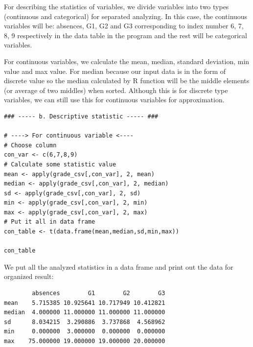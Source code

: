 \documentclass[a4paper]{article}
\newcounter{subsubsubsection}[subsubsection]
\numberwithin{equation}{section}
\begin{document}
For describing the statistics of variables, we divide variables into two types (continuous and categorical) for separated analyzing. In this case, the continuous variables will be: absences, G1, G2 and G3 corresponding to index number 6, 7, 8, 9 respectively in the data table in the program and the rest will be categorical variables.

For continuous variables, we calculate the mean, median, standard deviation, min value and max value. For median because our input data is in the form of discrete value so the median calculated by R function will be the middle elements (or average of two middles) when sorted. Although this is for discrete type variables, we can still use this for continuous variables for approximation.

\begin{mdframed}[leftline=false,rightline=false,backgroundcolor=magenta!10,nobreak=true]
  \begin{verbatim}
### ----- b. Descriptive statistic ----- ###

# ----> For continuous variable <----
# Choose column
con_var <- c(6,7,8,9)
# Calculate some statistic value
mean <- apply(grade_csv[,con_var], 2, mean)
median <- apply(grade_csv[,con_var], 2, median)
sd <- apply(grade_csv[,con_var], 2, sd)
min <- apply(grade_csv[,con_var], 2, min)
max <- apply(grade_csv[,con_var], 2, max)
# Put it all in data frame
con_table <- t(data.frame(mean,median,sd,min,max))

con_table
  \end{verbatim}
\end{mdframed}

We put all the analyzed statistics in a data frame and print out the data for organized result:
\begin{mdframed}[leftline=false,rightline=false,backgroundcolor=magenta!10,nobreak=true]
  \begin{verbatim}
        absences        G1        G2        G3
mean    5.715385 10.925641 10.717949 10.412821
median  4.000000 11.000000 11.000000 11.000000
sd      8.034215  3.290886  3.737868  4.568962
min     0.000000  3.000000  0.000000  0.000000
max    75.000000 19.000000 19.000000 20.000000
  \end{verbatim}
\end{mdframed}
\end{document}
